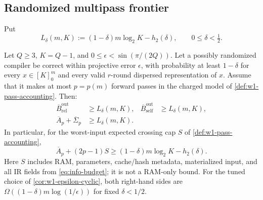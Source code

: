 \subsection{Randomized multipass frontier}
\label{sec:w1-randomized-multipass}

Put
\begin{equation}
 L_\delta(m,K):=(1-\delta)m\log_2K-h_2(\delta),
 \qquad 0\leq\delta<\tfrac12.
 \label{eq:w1-Ldelta}
\end{equation}

\begin{theorem}
\label{thm:w1-unified-frontier}
Let $Q\geq3$, $K=Q-1$, and
$0\leq\epsilon<\sin(\pi/(2Q))$.  Let a possibly randomized compiler be
correct within projective error $\epsilon$, with probability at least
$1-\delta$ for every $x\in[K]_0^m$ and every valid $r$-round dispersed
representation of $x$.  Assume that it makes at most $p=p(m)$ forward
passes in the charged model of \cref{def:w1-pass-accounting}.  Then:
\begin{align}
 \overline B_{\mathrm{rel}}^{\mathrm{out}}
 &\geq L_\delta(m,K),
 &
 \overline B_{\mathrm{self}}^{\mathrm{out}}
 &\geq L_\delta(m,K),
 \label{eq:w1-output-lower}\\
 \overline A_p+\overline\Sigma_p
 &\geq L_\delta(m,K).
 \label{eq:w1-pass-lower}
\end{align}
In particular, for the worst-input expected crossing cap $S$ of
\cref{def:w1-pass-accounting},
\begin{equation}
 \boxed{\quad
 \overline A_p+(2p-1)S
 \geq(1-\delta)m\log_2K-h_2(\delta).
 \quad}
 \label{eq:w1-frontier-box}
\end{equation}
Here $S$ includes RAM, parameters, cache/hash metadata, materialized input,
and all IR fields from \eqref{eq:info-budget}; it is not a RAM-only bound.
For the tuned choice of \cref{cor:w1-epsilon-cyclic}, both right-hand sides
are $\Omega((1-\delta)m\log(1/\epsilon))$ for fixed
$\delta<1/2$.
\end{theorem}

